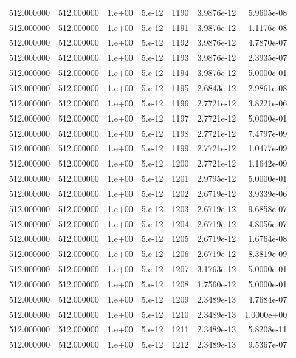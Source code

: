 \begin{table}[htbp]
\begin{tabular}{rrrrrrr}
512.000000 & 512.000000 & 1.e+00 & 5.e-12 & 1190 & 3.9876e-12 & 5.9605e-08 \\
512.000000 & 512.000000 & 1.e+00 & 5.e-12 & 1191 & 3.9876e-12 & 1.1176e-08 \\
512.000000 & 512.000000 & 1.e+00 & 5.e-12 & 1192 & 3.9876e-12 & 4.7870e-07 \\
512.000000 & 512.000000 & 1.e+00 & 5.e-12 & 1193 & 3.9876e-12 & 2.3935e-07 \\
512.000000 & 512.000000 & 1.e+00 & 5.e-12 & 1194 & 3.9876e-12 & 5.0000e-01 \\
512.000000 & 512.000000 & 1.e+00 & 5.e-12 & 1195 & 2.6843e-12 & 2.9861e-08 \\
512.000000 & 512.000000 & 1.e+00 & 5.e-12 & 1196 & 2.7721e-12 & 3.8221e-06 \\
512.000000 & 512.000000 & 1.e+00 & 5.e-12 & 1197 & 2.7721e-12 & 5.0000e-01 \\
512.000000 & 512.000000 & 1.e+00 & 5.e-12 & 1198 & 2.7721e-12 & 7.4797e-09 \\
512.000000 & 512.000000 & 1.e+00 & 5.e-12 & 1199 & 2.7721e-12 & 1.0477e-09 \\
512.000000 & 512.000000 & 1.e+00 & 5.e-12 & 1200 & 2.7721e-12 & 1.1642e-09 \\
512.000000 & 512.000000 & 1.e+00 & 5.e-12 & 1201 & 2.9795e-12 & 5.0000e-01 \\
512.000000 & 512.000000 & 1.e+00 & 5.e-12 & 1202 & 2.6719e-12 & 3.9339e-06 \\
512.000000 & 512.000000 & 1.e+00 & 5.e-12 & 1203 & 2.6719e-12 & 9.6858e-07 \\
512.000000 & 512.000000 & 1.e+00 & 5.e-12 & 1204 & 2.6719e-12 & 4.8056e-07 \\
512.000000 & 512.000000 & 1.e+00 & 5.e-12 & 1205 & 2.6719e-12 & 1.6764e-08 \\
512.000000 & 512.000000 & 1.e+00 & 5.e-12 & 1206 & 2.6719e-12 & 8.3819e-09 \\
512.000000 & 512.000000 & 1.e+00 & 5.e-12 & 1207 & 3.1763e-12 & 5.0000e-01 \\
512.000000 & 512.000000 & 1.e+00 & 5.e-12 & 1208 & 1.7560e-12 & 5.0000e-01 \\
512.000000 & 512.000000 & 1.e+00 & 5.e-12 & 1209 & 2.3489e-13 & 4.7684e-07 \\
512.000000 & 512.000000 & 1.e+00 & 5.e-12 & 1210 & 2.3489e-13 & 1.0000e+00 \\
512.000000 & 512.000000 & 1.e+00 & 5.e-12 & 1211 & 2.3489e-13 & 5.8208e-11 \\
512.000000 & 512.000000 & 1.e+00 & 5.e-12 & 1212 & 2.3489e-13 & 9.5367e-07 \\

\end{tabular}
\end{table}
